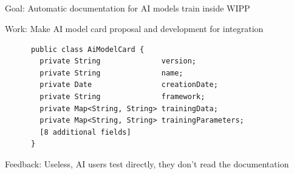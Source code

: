 \subsection{\slidetitle}
\begin{frame}[containsverbatim]
  \frametitle{\sectiontitle}
  \framesubtitle{\slidetitle}

  Goal: Automatic documentation for AI models train inside WIPP

  Work: Make AI model card proposal and development for integration

  \begin{listing}[H]
    \begin{verbatim}
      public class AiModelCard {
        private String              version;
        private String              name;
        private Date                creationDate;
        private String              framework;
        private Map<String, String> trainingData;
        private Map<String, String> trainingParameters;
        [8 additional fields]
      }
    \end{verbatim}
  \end{listing}

  Feedback: Useless, AI users test directly, they don't read the documentation

\end{frame}
